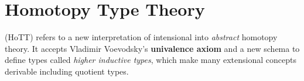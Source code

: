 











\section{Homotopy Type Theory}\label{hott}

\hott (HoTT) refers to a new interpretation of intensional \mltt
into \emph{abstract} homotopy theory.
It accepts Vladimir Voevodsky's \textbf{univalence axiom} and a new schema to define types called \emph{higher inductive types}, which make many extensional concepts derivable including quotient types.


